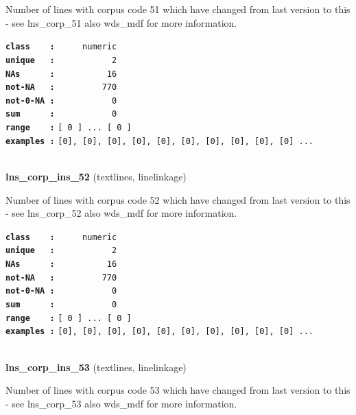 \documentclass[]{article}
\begin{document}
Number of lines with corpus code 51 which have changed from last version
to this - see lns\_corp\_51 also wds\_mdf for more information.

\textbf{\texttt{class\ \ \ \ :}} \texttt{~~~~~numeric}\\
\textbf{\texttt{unique\ \ \ :}} \texttt{~~~~~~~~~~~2}\\
\textbf{\texttt{NAs\ \ \ \ \ \ :}} \texttt{~~~~~~~~~~16}\\
\textbf{\texttt{not-NA\ \ \ :}} \texttt{~~~~~~~~~770}\\
\textbf{\texttt{not-0-NA\ :}} \texttt{~~~~~~~~~~~0}\\
\textbf{\texttt{sum\ \ \ \ \ \ :}} \texttt{~~~~~~~~~~~0}\\
\textbf{\texttt{range\ \ \ \ :}}
\texttt{{[}\ 0\ {]}\ ...\ {[}\ 0\ {]}}\\
\textbf{\texttt{examples\ :}}
\texttt{{[}0{]},\ {[}0{]},\ {[}0{]},\ {[}0{]},\ {[}0{]},\ {[}0{]},\ {[}0{]},\ {[}0{]},\ {[}0{]},\ {[}0{]}\ ...}\\

~

\textbf{lns\_corp\_ins\_52} (textlines, linelinkage)

Number of lines with corpus code 52 which have changed from last version
to this - see lns\_corp\_52 also wds\_mdf for more information.

\textbf{\texttt{class\ \ \ \ :}} \texttt{~~~~~numeric}\\
\textbf{\texttt{unique\ \ \ :}} \texttt{~~~~~~~~~~~2}\\
\textbf{\texttt{NAs\ \ \ \ \ \ :}} \texttt{~~~~~~~~~~16}\\
\textbf{\texttt{not-NA\ \ \ :}} \texttt{~~~~~~~~~770}\\
\textbf{\texttt{not-0-NA\ :}} \texttt{~~~~~~~~~~~0}\\
\textbf{\texttt{sum\ \ \ \ \ \ :}} \texttt{~~~~~~~~~~~0}\\
\textbf{\texttt{range\ \ \ \ :}}
\texttt{{[}\ 0\ {]}\ ...\ {[}\ 0\ {]}}\\
\textbf{\texttt{examples\ :}}
\texttt{{[}0{]},\ {[}0{]},\ {[}0{]},\ {[}0{]},\ {[}0{]},\ {[}0{]},\ {[}0{]},\ {[}0{]},\ {[}0{]},\ {[}0{]}\ ...}\\

~

\textbf{lns\_corp\_ins\_53} (textlines, linelinkage)

Number of lines with corpus code 53 which have changed from last version
to this - see lns\_corp\_53 also wds\_mdf for more information.
\end{document}
